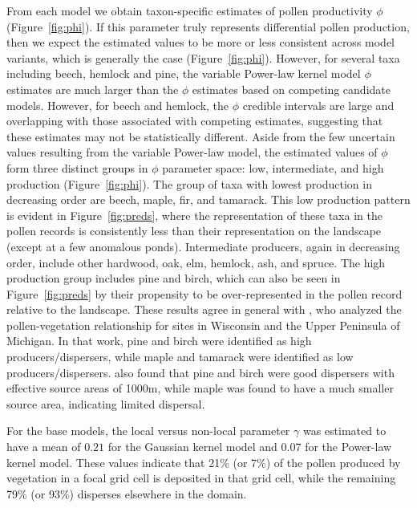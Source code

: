 \documentclass[12pt]{article}
\begin{document}
From each model we obtain taxon-specific estimates of pollen
productivity $\phi$ (Figure~\ref{fig:phi}). If this parameter truly
represents differential pollen production, then we expect the
estimated values to be more or less consistent across model variants,
which is generally the case (Figure~\ref{fig:phi}). However, for
several taxa including beech, hemlock and pine, the variable Power-law
kernel model $\phi$ estimates are much larger than the $\phi$
estimates based on competing candidate models. However, for beech and
hemlock, the $\phi$ credible intervals are large and overlapping with
those associated with competing estimates, suggesting that these
estimates may not be statistically different. Aside from the few
uncertain values resulting from the variable Power-law model, the
estimated values of $\phi$ form three distinct groups in $\phi$
parameter space: low, intermediate, and high production
(Figure~\ref{fig:phi}). The group of taxa with lowest production in
decreasing order are beech, maple, fir, and tamarack. This low
production pattern is evident in Figure~\ref{fig:preds}, where the
representation of these taxa in the pollen records is consistently
less than their representation on the landscape (except at a few
anomalous ponds). Intermediate producers, again in decreasing order,
include other hardwood, oak, elm, hemlock, ash, and spruce. The high
production group includes pine and birch, which can also be seen in
Figure~\ref{fig:preds} by their propensity to be over-represented in
the pollen record relative to the landscape. These results agree in
general with \citep{prentice1986}, who analyzed the pollen-vegetation
relationship for sites in Wisconsin and the Upper Peninsula of
Michigan. In that work, pine and birch were identified as high
producers/dispersers, while maple and tamarack were identified as low
producers/dispersers. \citep{jackson1990} also found that pine and
birch were good dispersers with effective source areas of 1000m, while
maple was found to have a much smaller source area, indicating limited
dispersal.


For the base models, the local versus non-local parameter $\gamma$ was
estimated to have a mean of $0.21$ for the Gaussian kernel model and
$0.07$ for the Power-law kernel model. These values indicate that 21\%
(or 7\%) of the pollen produced by vegetation in a focal grid cell is
deposited in that grid cell, while the remaining 79\% (or 93\%)
disperses elsewhere in the domain.
\end{document}
